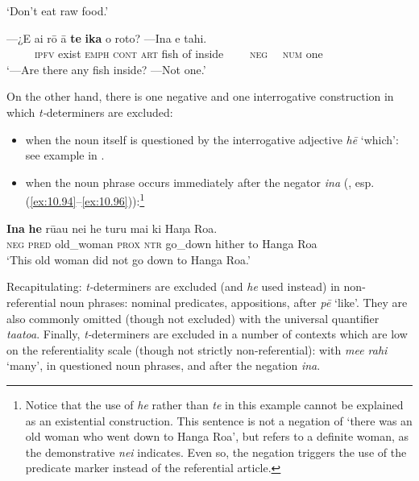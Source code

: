 \glt 
‘Don’t eat raw food.’  
\z

\ea\label{ex:5.40}
\gll —¿E ai rō {\ꞌ}ā \textbf{te} \textbf{ika} o roto? —{\ꞌ}Ina e tahi. \\
~~~~~\textsc{ipfv} exist \textsc{emph} \textsc{cont} \textsc{art} fish of inside ~~~~\textsc{neg~~} \textsc{num} one \\

\glt
‘—Are there any fish inside? —Not one.’ \textstyleExampleref{[R241.058]} 
\z

On the other hand, there is one negative and one interrogative construction in which \textit{t-}determiners are excluded:

\begin{itemize}
\item 
when the noun itself is questioned by the interrogative adjective \textit{hē} ‘which’: see example  in .

\item 
when the noun phrase occurs immediately after the negator \textit{{\ꞌ}ina} (, esp. (\ref{ex:10.94}–\ref{ex:10.96})):\footnote{Notice that the use of \textit{he} rather than \textit{te} in this example cannot be explained as an existential construction. This sentence is not a negation of ‘there was an old woman who went down to Hanga Roa’, but refers to a definite woman, as the demonstrative \textit{nei} indicates. Even so, the negation triggers the use of the predicate marker instead of the referential article.}

\end{itemize}

\ea\label{ex:5.41}
\gll \textbf{{\ꞌ}Ina} \textbf{he} rū{\ꞌ}au nei he turu mai ki Haŋa Roa. \\
\textsc{neg} \textsc{pred} old\_woman \textsc{prox} \textsc{ntr} go\_down hither to Hanga Roa \\

\glt
‘This old woman did not go down to Hanga Roa.’ \textstyleExampleref{[R380.006]} 
\z

Recapitulating: \textit{t-}determiners are excluded (and \textit{he} used instead) in non-referential noun phrases: nominal predicates, appositions, after \textit{p}\textit{ē} ‘like’. They are also commonly omitted (though not excluded) with the universal quantifier \textit{\mbox{ta{\ꞌ}ato{\ꞌ}a}}. Finally, \textit{t-}determin\-ers are excluded in a number of contexts which are low on the referentiality scale (though not strictly non-referential): with \textit{me{\ꞌ}e rahi} ‘many’, in questioned noun phrases, and after the negation \textit{{\ꞌ}ina}. 

